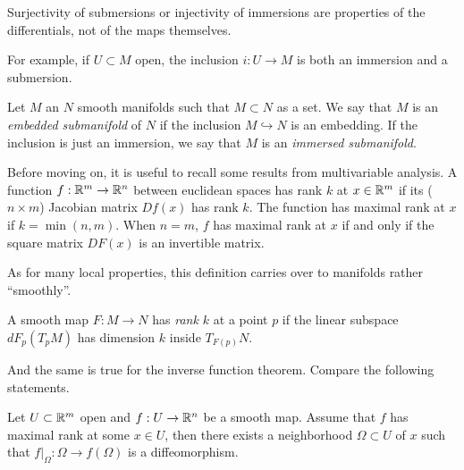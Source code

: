 \begin{rmk}
    Surjectivity of submersions or injectivity of immersions are properties of the differentials, not of the maps themselves.
    
    For example, if $U\subset M$ open, the inclusion $i: U \to M$ is both an immersion and a submersion.
\end{rmk}

\begin{defn}
    Let $M$ an $N$ smooth manifolds such that $M\subset N$ as a set.
    We say that $M$ is an \emph{embedded submanifold} of $N$ if the inclusion $M\hookrightarrow N$ is an embedding. If the inclusion is just an immersion, we say that $M$ is an \emph{immersed submanifold}.
\end{defn}

Before moving on, it is useful to recall some results from multivariable analysis.
A function $f:\mathbb{R}^m \to \mathbb{R}^n$ between euclidean spaces has rank $k$ at $x\in\mathbb{R}^m$ if its ($n\times m$) Jacobian matrix $Df(x)$ has rank $k$.
The function has maximal rank at $x$ if $k = \min(n,m)$.
When $n=m$, $f$ has maximal rank at $x$ if and only if the square matrix $DF(x)$ is an invertible matrix.

As for many local properties, this definition carries over to manifolds rather ``smoothly''.

\begin{defn}
    A smooth map $F:M\to N$ has \emph{rank $k$} at a point $p$ if the linear subspace $dF_p(T_pM)$ has dimension $k$ inside $T_{F(p)}N$.
\end{defn}

And the same is true for the inverse function theorem.
Compare the following statements.

\begin{thm}\label{thm:ift}
    Let $U\subset\mathbb{R}^m$ open and $f:U \to \mathbb{R}^n$ be a smooth map.
    Assume that $f$ has maximal rank at some $x\in U$, then there exists a neighborhood $\Omega\subset U$ of $x$ such that  $f\big|_\Omega : \Omega \to f(\Omega)$ is a diffeomorphism.
\end{thm}

